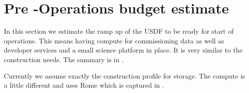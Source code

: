 \section{Pre -Operations budget estimate}\label{sec:opscost}
In this section we estimate the ramp up of the USDF to be ready for start of operations.
This means having compute for commissioning data as well as developer services and a small science platform in place.
It is very similar to the construction needs. The summary is in .



Currently we assume exactly the construction profile for storage. The compute is a little different and uses Rome
which is captured in .



